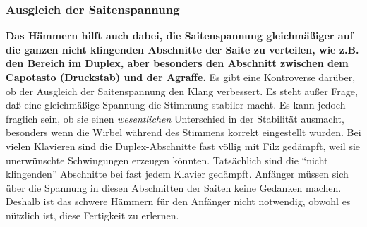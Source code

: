 \label{c2_5g}
\subsubsection{Ausgleich der Saitenspannung}
\label{c2_5_span} 

\textbf{Das Hämmern hilft auch dabei, die Saitenspannung gleichmäßiger auf die ganzen nicht klingenden Abschnitte der Saite zu verteilen, wie z.B. den Bereich im Duplex, aber besonders den Abschnitt zwischen dem Capotasto (Druckstab) und der Agraffe.}
Es gibt eine Kontroverse darüber, ob der Ausgleich der Saitenspannung den Klang verbessert.
Es steht außer Frage, daß eine gleichmäßige Spannung die Stimmung stabiler macht.
Es kann jedoch fraglich sein, ob sie einen \textit{wesentlichen} Unterschied in der Stabilität ausmacht, besonders wenn die Wirbel während des Stimmens korrekt eingestellt wurden.
Bei vielen Klavieren sind die Duplex-Abschnitte fast völlig mit Filz gedämpft, weil sie unerwünschte Schwingungen erzeugen könnten.
Tatsächlich sind die \enquote{nicht klingenden} Abschnitte bei fast jedem Klavier gedämpft.
Anfänger müssen sich über die Spannung in diesen Abschnitten der Saiten keine Gedanken machen.
Deshalb ist das schwere Hämmern für den Anfänger nicht notwendig, obwohl es nützlich ist, diese Fertigkeit zu erlernen.

